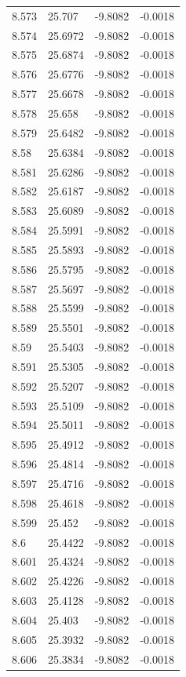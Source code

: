 \begin{tabular}{llll}
8.573 & 25.707 & -9.8082 & -0.0018 \\
8.574 & 25.6972 & -9.8082 & -0.0018 \\
8.575 & 25.6874 & -9.8082 & -0.0018 \\
8.576 & 25.6776 & -9.8082 & -0.0018 \\
8.577 & 25.6678 & -9.8082 & -0.0018 \\
8.578 & 25.658 & -9.8082 & -0.0018 \\
8.579 & 25.6482 & -9.8082 & -0.0018 \\
8.58 & 25.6384 & -9.8082 & -0.0018 \\
8.581 & 25.6286 & -9.8082 & -0.0018 \\
8.582 & 25.6187 & -9.8082 & -0.0018 \\
8.583 & 25.6089 & -9.8082 & -0.0018 \\
8.584 & 25.5991 & -9.8082 & -0.0018 \\
8.585 & 25.5893 & -9.8082 & -0.0018 \\
8.586 & 25.5795 & -9.8082 & -0.0018 \\
8.587 & 25.5697 & -9.8082 & -0.0018 \\
8.588 & 25.5599 & -9.8082 & -0.0018 \\
8.589 & 25.5501 & -9.8082 & -0.0018 \\
8.59 & 25.5403 & -9.8082 & -0.0018 \\
8.591 & 25.5305 & -9.8082 & -0.0018 \\
8.592 & 25.5207 & -9.8082 & -0.0018 \\
8.593 & 25.5109 & -9.8082 & -0.0018 \\
8.594 & 25.5011 & -9.8082 & -0.0018 \\
8.595 & 25.4912 & -9.8082 & -0.0018 \\
8.596 & 25.4814 & -9.8082 & -0.0018 \\
8.597 & 25.4716 & -9.8082 & -0.0018 \\
8.598 & 25.4618 & -9.8082 & -0.0018 \\
8.599 & 25.452 & -9.8082 & -0.0018 \\
8.6 & 25.4422 & -9.8082 & -0.0018 \\
8.601 & 25.4324 & -9.8082 & -0.0018 \\
8.602 & 25.4226 & -9.8082 & -0.0018 \\
8.603 & 25.4128 & -9.8082 & -0.0018 \\
8.604 & 25.403 & -9.8082 & -0.0018 \\
8.605 & 25.3932 & -9.8082 & -0.0018 \\
8.606 & 25.3834 & -9.8082 & -0.0018 \\

\end{tabular}
